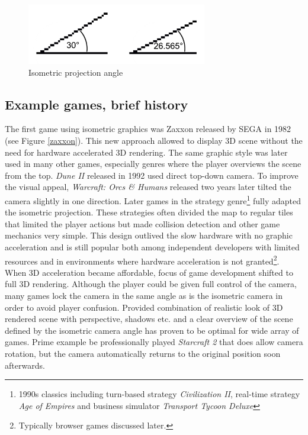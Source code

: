 \documentclass[11pt,oneside, final]{fithesis2}
\begin{document}
\begin{figure}[h]
	\centering
	\includegraphics[width=0.7\textwidth]{thesis-angles}
	\caption{Isometric projection angle}
	\label{isoangle}
\end{figure}

\subsection{Example games, brief history}
The first game using isometric graphics was Zaxxon released by SEGA in 1982\cite{zaxxon} (see Figure \ref{zaxxon}). This new approach allowed to display 3D scene without the need for hardware accelerated 3D rendering. The same graphic style was later used in many other games, especially genres where the player overviews the scene from the top. \emph{Dune II} released in 1992\cite{dune2} used direct top-down camera. To improve the visual appeal, \emph{Warcraft: Orcs \& Humans} released two years later\cite{blizzardlegacy} tilted the camera slightly in one direction. Later games in the strategy genre\footnote{1990s classics including turn-based strategy \emph{Civilization II}\cite{civ2}, real-time strategy \emph{Age of Empires}\cite{ageofempires} and business simulator \emph{Transport Tycoon Deluxe}\cite{ttd}} fully adapted the isometric projection. These strategies often divided the map to regular tiles that limited the player actions but made collision detection and other game mechanics very simple. This design outlived the slow hardware with no graphic acceleration and is still popular both among independent developers with limited resources and in environments where hardware acceleration is not granted\footnote{Typically browser games discussed later.}. When 3D acceleration became affordable, focus of game development shifted to full 3D rendering. Although the player could be given full control of the camera, many games lock the camera in the same angle as is the isometric camera in order to avoid player confusion. Provided combination of realistic look of 3D rendered scene with perspective, shadows etc. and a clear overview of the scene defined by the isometric camera angle has proven to be optimal for wide array of games. Prime example be professionally played \emph{Starcraft 2}\cite{sc2} that does allow camera rotation, but the camera automatically returns to the original position soon afterwards.
\end{document}
